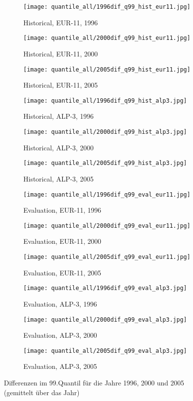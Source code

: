 \begin{figure}
	\begin{subfigure}{0.32\textwidth}
		\texttt{[image: quantile\_all/1996dif\_q99\_hist\_eur11.jpg]}
		\caption{Historical, EUR-11, 1996}
	\end{subfigure}
	\begin{subfigure}{0.32\textwidth}
		\texttt{[image: quantile\_all/2000dif\_q99\_hist\_eur11.jpg]}
		\caption{Historical, EUR-11, 2000}
	\end{subfigure}
	\begin{subfigure}{0.32\textwidth}
		\texttt{[image: quantile\_all/2005dif\_q99\_hist\_eur11.jpg]}
		\caption{Historical, EUR-11, 2005}
	\end{subfigure}
	\begin{subfigure}{0.32\textwidth}
		\texttt{[image: quantile\_all/1996dif\_q99\_hist\_alp3.jpg]}
		\caption{Historical, ALP-3, 1996}
	\end{subfigure}
	\begin{subfigure}{0.32\textwidth}
		\texttt{[image: quantile\_all/2000dif\_q99\_hist\_alp3.jpg]}
		\caption{Historical, ALP-3, 2000}
	\end{subfigure}
	\begin{subfigure}{0.32\textwidth}
		\texttt{[image: quantile\_all/2005dif\_q99\_hist\_alp3.jpg]}
		\caption{Historical, ALP-3, 2005}
	\end{subfigure}
	\begin{subfigure}{0.32\textwidth}
		\texttt{[image: quantile\_all/1996dif\_q99\_eval\_eur11.jpg]}
		\caption{Evaluation, EUR-11, 1996}
	\end{subfigure}
	\begin{subfigure}{0.32\textwidth}
		\texttt{[image: quantile\_all/2000dif\_q99\_eval\_eur11.jpg]}
		\caption{Evaluation, EUR-11, 2000}
	\end{subfigure}
	\begin{subfigure}{0.32\textwidth}
		\texttt{[image: quantile\_all/2005dif\_q99\_eval\_eur11.jpg]}
		\caption{Evaluation, EUR-11, 2005}
	\end{subfigure}
	\begin{subfigure}{0.32\textwidth}
		\texttt{[image: quantile\_all/1996dif\_q99\_eval\_alp3.jpg]}
		\caption{Evaluation, ALP-3, 1996}
	\end{subfigure}
	\begin{subfigure}{0.32\textwidth}
		\texttt{[image: quantile\_all/2000dif\_q99\_eval\_alp3.jpg]}
		\caption{Evaluation, ALP-3, 2000}
	\end{subfigure}
	\begin{subfigure}{0.32\textwidth}
		\texttt{[image: quantile\_all/2005dif\_q99\_eval\_alp3.jpg]}
		\caption{Evaluation, ALP-3, 2005}
	\end{subfigure}
	\caption{Differenzen im 99.Quantil für die Jahre 1996, 2000 und 2005 (gemittelt über das Jahr)}
	\label{fig:quantile_alp3}
\end{figure}

